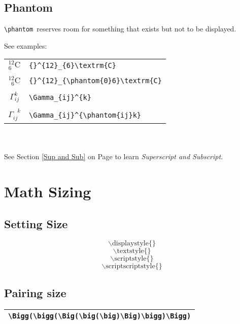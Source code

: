 \documentclass[a4paper]{report}
\begin{document}
\subsection{Phantom}

\verb|\phantom|\ reserves room for something that exists but not to
be displayed.

See examples:\\

\begin{tabular}{c @{\quad} l}

${}^{12}_{6}\textrm{C}$ & \verb|{}^{12}_{6}\textrm{C}|\\\\

${}^{12}_{\phantom{0}6}\textrm{C}$ & \verb|{}^{12}_{\phantom{0}6}\textrm{C}|\\\\

$\Gamma_{ij}^{k}$ & \verb|\Gamma_{ij}^{k}|\\\\

$\Gamma_{ij}^{\phantom{ij}k}$ & \verb|\Gamma_{ij}^{\phantom{ij}k}|

\end{tabular}\\\\

See Section \ref{Sup and Sub} on Page \pageref{Sup and Sub} to learn
\emph{Superscript and Subscript}.

\section{Math Sizing}
\subsection{Setting Size}

\[\displaystyle{\backslash\mathrm{displaystyle\{\}}}\]
\[\textstyle{\backslash\mathrm{textstyle\{\}}}\]
\[\scriptstyle{\backslash\mathrm{scriptstyle\{\}}}\]
\[\scriptscriptstyle{\backslash\mathrm{scriptscriptstyle\{\}}}\]
\subsection{Pairing size}

\begin{tabular}{|l|}

\hline \verb|\Bigg(\bigg(\Big(\big(\big)\Big)\bigg)\Bigg)|\\
\hline
\end{tabular}
\end{document}
